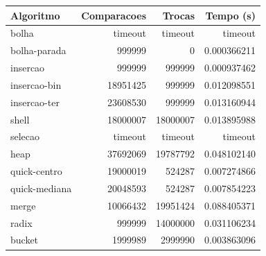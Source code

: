 \begin{tabular}{lrrr}
\hline
Algoritmo & Comparacoes & Trocas & Tempo (s) \\
\hline
bolha & timeout & timeout & timeout \\
bolha-parada & 999999 & 0 & 0.000366211 \\
insercao & 999999 & 999999 & 0.000937462 \\
insercao-bin & 18951425 & 999999 & 0.012098551 \\
insercao-ter & 23608530 & 999999 & 0.013160944 \\
shell & 18000007 & 18000007 & 0.013895988 \\
selecao & timeout & timeout & timeout \\
heap & 37692069 & 19787792 & 0.048102140 \\
quick-centro & 19000019 & 524287 & 0.007274866 \\
quick-mediana & 20048593 & 524287 & 0.007854223 \\
merge & 10066432 & 19951424 & 0.088405371 \\
radix & 999999 & 14000000 & 0.031106234 \\
bucket & 1999989 & 2999990 & 0.003863096 \\
\hline
\end{tabular}
